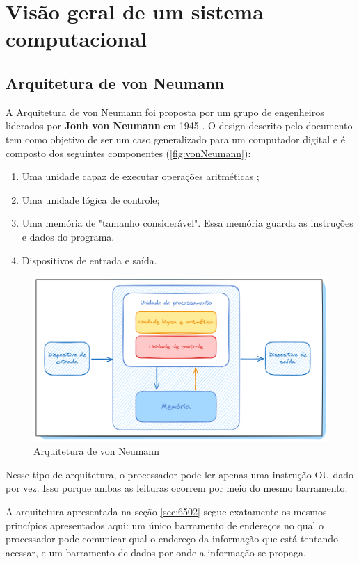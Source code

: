 \documentclass[
	12pt,				  %
	openright,		%
	a4paper,			%
	english,			%
	french,				%
	spanish,			%
	brazil,				%
]{abntex2}
\begin{document}
\section{Visão geral de um sistema computacional}
\subsection{Arquitetura de von Neumann}

A Arquitetura de von Neumann foi proposta por um grupo de engenheiros liderados
por \textbf{Jonh von Neumann} em 1945 \cite{vonNeumann}. O design descrito pelo
documento tem como objetivo de ser um caso generalizado para um computador
digital e é composto dos seguintes componentes (\autoref{fig:vonNeumann}):
\begin{enumerate}
	\item Uma unidade capaz de executar operações aritméticas ;
	\item Uma unidade lógica de controle;
	\item Uma memória de "tamanho considerável". Essa memória guarda as
	      instruções e dados do programa.
	\item Dispositivos de entrada e saída.
\end{enumerate}

\begin{figure}[h]
	\centering
	\caption{Arquitetura de von Neumann}
	\label{fig:vonNeumann}
	\includegraphics[scale=0.30]{../assets/img/von-neumann.png}
\end{figure}

Nesse tipo de arquitetura, o processador pode ler apenas uma instrução OU dado
por vez. Isso porque ambas as leituras ocorrem por meio do mesmo barramento.

A arquitetura apresentada na seção \ref{sec:6502} segue exatamente os mesmos
princípios apresentados aqui: um único barramento de endereços no qual o
processador pode comunicar qual o endereço da informação que está tentando
acessar, e um barramento de dados por onde a informação se propaga.
\end{document}
